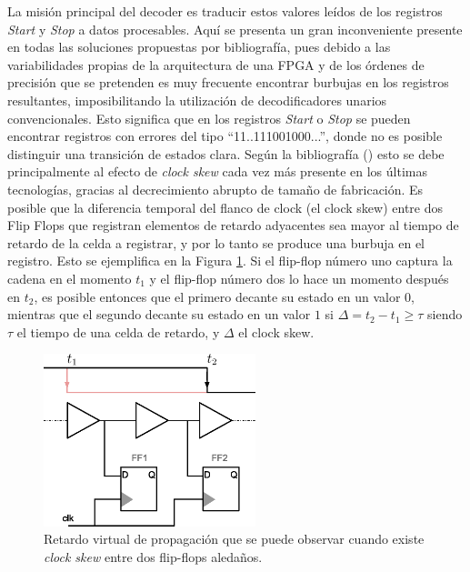 La misión principal del decoder es traducir estos valores leídos de los registros \textit{Start} y \textit{Stop} a datos procesables. 
Aquí se presenta un gran inconveniente presente en todas las soluciones propuestas por bibliografía, pues debido a las variabilidades
propias de la arquitectura de una FPGA y de los órdenes de precisión que se pretenden es muy frecuente encontrar burbujas en los registros
resultantes, imposibilitando la utilización de decodificadores unarios convencionales. Esto significa que en los registros \textit{Start} o
\textit{Stop} se pueden encontrar registros con errores del tipo ``11..111001000...'', donde no es posible distinguir una transición de
estados clara. Según la bibliografía (\cite{Machado}) esto se debe principalmente al efecto de \textit{clock skew} cada vez más presente en los últimas tecnologías,
gracias al decrecimiento abrupto de tamaño de fabricación. Es posible que la diferencia temporal del flanco de clock (el clock skew) 
entre dos Flip Flops que registran elementos de retardo adyacentes sea mayor al tiempo de retardo de la celda a registrar, y por lo tanto 
se produce una burbuja en el registro. Esto se ejemplifica en la Figura \ref{fig: bubble}. Si el flip-flop número uno
captura la cadena en el momento $t_1$ y el flip-flop número dos lo hace un momento después en $t_2$, es posible entonces que el primero
decante su estado en un valor $0$, mientras que el segundo decante su estado en un valor $1$ si $\Delta = t_2 - t_1 \geq \tau$
siendo $\tau$ el tiempo de una celda de retardo, y $\Delta$ el clock skew.

\begin{figure}[H]
      \centering
      \includegraphics[width=0.55\textwidth]{imagenes/bubble.eps}
      \caption{Retardo virtual de propagación que se puede observar cuando existe \textit{clock skew} entre dos flip-flops aledaños.}
      \label{fig: bubble}
\end{figure}

